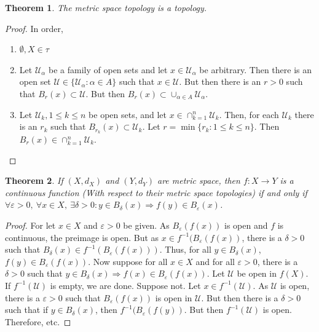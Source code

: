 \documentclass[12pt,oneside]{book}
\theoremstyle{mystyle}
\newtheorem{theorem}{Theorem}[section]
\begin{document}
\begin{theorem}
The metric space topology is a topology.
\end{theorem}
\begin{proof}
In order,
\begin{enumerate}
\item $\emptyset, X \in \tau$
\item Let $\mathcal{U}_{\alpha}$ be a family of open sets and let $x\in \mathcal{U}_{\alpha}$ be arbitrary. Then there is an open set $\mathcal{U} \in \{\mathcal{U}_{\alpha}:\alpha\in A\}$ such that $x\in \mathcal{U}$. But then there is an $r>0$ such that $B_{r}(x)\subset\mathcal{U}$. But then $B_{r}(x) \subset \cup_{\alpha \in A}\mathcal{U}_{\alpha}$.
\item Let $\mathcal{U}_{k}, 1\leq k \leq n$ be open sets, and let $x\in \cap_{k=1}^{n} \mathcal{U}_k$. Then, for each $\mathcal{U}_k$ there is an $r_{k}$ such that $B_{r_k}(x)\subset \mathcal{U}_{k}$. Let $r = \min\{r_k:1\leq k \leq n\}$. Then $B_{r}(x) \in \cap_{k=1}^{n}\mathcal{U}_k$.
\end{enumerate}
\end{proof}

\begin{theorem}
If $(X,d_X)$ and $(Y,d_Y)$ are metric space, then $f:X\rightarrow Y$ is a continuous function (With respect to their metric space topologies) if and only if $\forall \varepsilon>0,\ \forall x\in X,\ \exists \delta>0:y\in B_{\delta}(x)\Rightarrow f(y) \in B_{\varepsilon}(x)$.
\end{theorem}
\begin{proof}
For let $x\in X$ and $\varepsilon>0$ be given. As $B_{\varepsilon}(f(x))$ is open and $f$ is continuous, the preimage is open. But as $x\in f^{-1}(B_{\varepsilon}(f(x))$, there is a $\delta>0$ such that $B_{\delta}(x)\in f^{-1}(B_{\varepsilon}(f(x)))$. Thus, for all $y \in B_{\delta}(x)$, $f(y) \in B_{\varepsilon}(f(x))$. Now suppose for all $x\in X$ and for all $\varepsilon>0$, there is a $\delta>0$ such that $y\in B_{\delta}(x)\Rightarrow f(x) \in B_{\varepsilon}(f(x))$. Let $\mathcal{U}$ be open in $f(X)$. If $f^{-1}(\mathcal{U})$ is empty, we are done. Suppose not. Let $x\in f^{-1}(\mathcal{U})$. As $\mathcal{U}$ is open, there is a $\varepsilon>0$ such that $B_{\varepsilon}(f(x))$ is open in $\mathcal{U}$. But then there is a $\delta>0$ such that if $y\in B_{\delta}(x)$, then $f^{-1}(B_{\varepsilon}(f(y))$. But then $f^{-1}(\mathcal{U})$ is open. Therefore, etc.
\end{proof}
\end{document}

